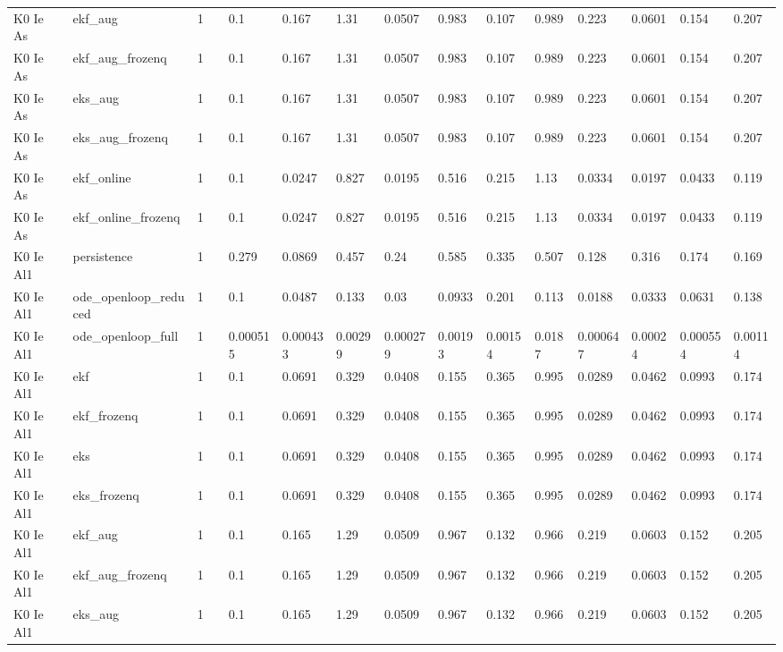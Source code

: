 \begin{table}[t]
\begin{tabular}{lllllllllllllll}
K0 Ie As & ekf\_aug & 1 &  & 0.1 & 0.167 & 1.31 & 0.0507 & 0.983 & 0.107 & 0.989 & 0.223 & 0.0601 & 0.154 & 0.207 \\
K0 Ie As & ekf\_aug\_frozenq & 1 &  & 0.1 & 0.167 & 1.31 & 0.0507 & 0.983 & 0.107 & 0.989 & 0.223 & 0.0601 & 0.154 & 0.207 \\
K0 Ie As & eks\_aug & 1 &  & 0.1 & 0.167 & 1.31 & 0.0507 & 0.983 & 0.107 & 0.989 & 0.223 & 0.0601 & 0.154 & 0.207 \\
K0 Ie As & eks\_aug\_frozenq & 1 &  & 0.1 & 0.167 & 1.31 & 0.0507 & 0.983 & 0.107 & 0.989 & 0.223 & 0.0601 & 0.154 & 0.207 \\
K0 Ie As & ekf\_online & 1 &  & 0.1 & 0.0247 & 0.827 & 0.0195 & 0.516 & 0.215 & 1.13 & 0.0334 & 0.0197 & 0.0433 & 0.119 \\
K0 Ie As & ekf\_online\_frozenq & 1 &  & 0.1 & 0.0247 & 0.827 & 0.0195 & 0.516 & 0.215 & 1.13 & 0.0334 & 0.0197 & 0.0433 & 0.119 \\
K0 Ie Al1 & persistence & 1 &  & 0.279 & 0.0869 & 0.457 & 0.24 & 0.585 & 0.335 & 0.507 & 0.128 & 0.316 & 0.174 & 0.169 \\
K0 Ie Al1 & ode\_openloop\_reduced & 1 &  & 0.1 & 0.0487 & 0.133 & 0.03 & 0.0933 & 0.201 & 0.113 & 0.0188 & 0.0333 & 0.0631 & 0.138 \\
K0 Ie Al1 & ode\_openloop\_full & 1 &  & 0.000515 & 0.000433 & 0.00299 & 0.000279 & 0.00193 & 0.00154 & 0.0187 & 0.000647 & 0.00024 & 0.000554 & 0.00114 \\
K0 Ie Al1 & ekf & 1 &  & 0.1 & 0.0691 & 0.329 & 0.0408 & 0.155 & 0.365 & 0.995 & 0.0289 & 0.0462 & 0.0993 & 0.174 \\
K0 Ie Al1 & ekf\_frozenq & 1 &  & 0.1 & 0.0691 & 0.329 & 0.0408 & 0.155 & 0.365 & 0.995 & 0.0289 & 0.0462 & 0.0993 & 0.174 \\
K0 Ie Al1 & eks & 1 &  & 0.1 & 0.0691 & 0.329 & 0.0408 & 0.155 & 0.365 & 0.995 & 0.0289 & 0.0462 & 0.0993 & 0.174 \\
K0 Ie Al1 & eks\_frozenq & 1 &  & 0.1 & 0.0691 & 0.329 & 0.0408 & 0.155 & 0.365 & 0.995 & 0.0289 & 0.0462 & 0.0993 & 0.174 \\
K0 Ie Al1 & ekf\_aug & 1 &  & 0.1 & 0.165 & 1.29 & 0.0509 & 0.967 & 0.132 & 0.966 & 0.219 & 0.0603 & 0.152 & 0.205 \\
K0 Ie Al1 & ekf\_aug\_frozenq & 1 &  & 0.1 & 0.165 & 1.29 & 0.0509 & 0.967 & 0.132 & 0.966 & 0.219 & 0.0603 & 0.152 & 0.205 \\
K0 Ie Al1 & eks\_aug & 1 &  & 0.1 & 0.165 & 1.29 & 0.0509 & 0.967 & 0.132 & 0.966 & 0.219 & 0.0603 & 0.152 & 0.205 \\

\end{tabular}
\end{table}
